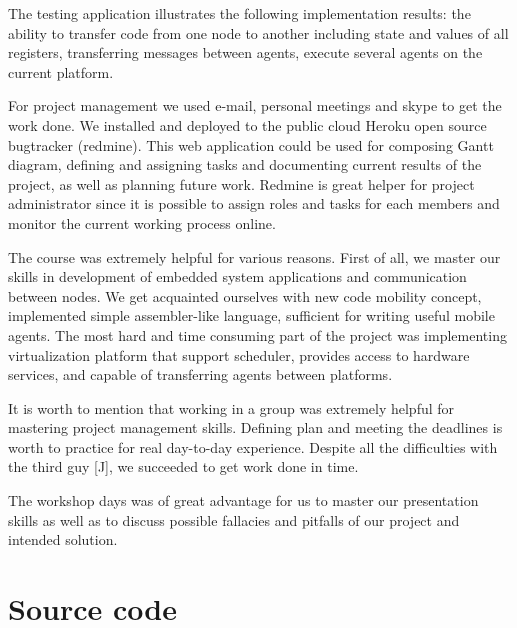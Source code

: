 \documentclass{scrreprt}
\begin{document}
The testing application illustrates the following implementation results: the  ability to transfer code from
one node to another including state and values of all registers,
transferring messages between agents, execute several agents on the current platform.


For project management we used e-mail, personal meetings and skype to get the work done.
We installed and deployed to the public cloud Heroku
open source bugtracker (redmine). This web application could be used for composing Gantt diagram,
defining and assigning tasks and documenting current results of the project, as well as
planning future work.
Redmine is great helper for project administrator since it is possible to assign 
roles and tasks for each members and monitor the current working process online.


The course was extremely helpful for various reasons.
First of all, we master our skills in development of embedded system applications and 
communication between nodes.
We get acquainted ourselves with new code mobility concept, implemented simple
assembler-like language, sufficient for writing useful mobile agents.
The most hard and time consuming part of the project was implementing
virtualization platform that support scheduler, provides access to hardware services,
and capable of transferring agents between platforms.


It is worth to mention that working in a group was extremely helpful for mastering project
management skills. Defining plan and meeting the deadlines is worth to practice 
for real day-to-day experience. Despite all the difficulties with the third guy [J],
we succeeded to get work done in time.


The workshop days was of great advantage for us to master our presentation skills as well as
to discuss possible fallacies and pitfalls of our project and intended solution.



	

	


\appendix

\chapter{Source code}
\end{document}
